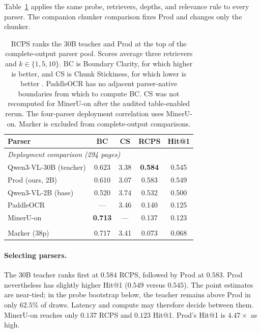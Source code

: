\documentclass[11pt]{article}
\newcommand{\rcps}{\textnormal{\textsc{RCPS}}}
\begin{document}
Table~\ref{tab:grid} applies the same probe, retrievers, depths, and relevance rule to every parser. The companion chunker comparison fixes Prod and changes only the chunker.

\begin{table}[!b]
\centering\footnotesize
\setlength{\tabcolsep}{2.5pt}
\begin{tabular}{lcccc}
\toprule
Parser & BC & CS & \rcps{} & Hit@1 \\
\midrule
\multicolumn{5}{l}{\textit{Deployment comparison (294 pages)}} \\
Qwen3-VL-30B (teacher) & 0.623 & 3.38 & \textbf{0.584} & 0.545 \\
Prod (ours, 2B) & 0.610 & 3.07 & 0.583 & 0.549 \\
Qwen3-VL-2B (base) & 0.520 & 3.74 & 0.532 & 0.500 \\
PaddleOCR & --- & 3.46 & 0.140 & 0.125 \\
MinerU-on & \textbf{0.713} & --- & 0.137 & 0.123 \\
\addlinespace
\multicolumn{5}{l}{\textit{Partial output}} \\
Marker (38p) & 0.717 & 3.41 & 0.073 & 0.068 \\
\bottomrule
\end{tabular}
\caption{\rcps{} ranks the 30B teacher and Prod at the top of the complete-output parser pool. Scores average three retrievers and $k\in\{1,5,10\}$. BC is Boundary Clarity, for which higher is better, and CS is Chunk Stickiness, for which lower is better \citep{zhao2025moc}. PaddleOCR has no adjacent parser-native boundaries from which to compute BC. CS was not recomputed for MinerU-on after the audited table-enabled rerun. The four-parser deployment correlation uses MinerU-on. Marker is excluded from complete-output comparisons.}
\label{tab:grid}
\end{table}

\paragraph{Selecting parsers.} The 30B teacher ranks first at $0.584$ \rcps{}, followed by Prod at $0.583$. Prod nevertheless has slightly higher Hit@1 ($0.549$ versus $0.545$). The point estimates are near-tied; in the probe bootstrap below, the teacher remains above Prod in only $62.5\%$ of draws. Latency and compute may therefore decide between them. MinerU-on reaches only $0.137$ \rcps{} and $0.123$ Hit@1. Prod's Hit@1 is $4.47\times$ as high.
\end{document}
